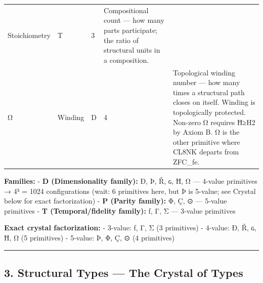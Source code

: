 \documentclass[12pt,a4paper]{article}
\begin{document}
\begin{longtable}[]{@{}lllll@{}}
\begin{minipage}[t]{0.12\columnwidth}
Stoichiometry\strut
\end{minipage} & \begin{minipage}[t]{0.16\columnwidth}\raggedright
T\strut
\end{minipage} & \begin{minipage}[t]{0.16\columnwidth}\raggedright
3\strut
\end{minipage} & \begin{minipage}[t]{0.27\columnwidth}\raggedright
Compositional count --- how many parts participate; the ratio of
structural units in a composition.\strut
\end{minipage}\tabularnewline
\begin{minipage}[t]{0.14\columnwidth}\raggedright
Ω\strut
\end{minipage} & \begin{minipage}[t]{0.12\columnwidth}\raggedright
Winding\strut
\end{minipage} & \begin{minipage}[t]{0.16\columnwidth}\raggedright
D\strut
\end{minipage} & \begin{minipage}[t]{0.16\columnwidth}\raggedright
4\strut
\end{minipage} & \begin{minipage}[t]{0.27\columnwidth}\raggedright
Topological winding number --- how many times a structural path closes
on itself. Winding is topologically protected. Non-zero Ω requires Ħ≥H2
by Axiom B. Ω is the other primitive where CL8NK departs from
ZFC\_fe.\strut
\end{minipage}\tabularnewline
\bottomrule
\end{longtable}

\textbf{Families:} - \textbf{D (Dimensionality family):} Ð, Þ, Ř, ɢ, Ħ,
Ω --- 4-value primitives → 4⁵ = 1024 configurations (wait: 6 primitives
here, but Þ is 5-value; see Crystal below for exact factorization) -
\textbf{P (Parity family):} Φ, Ç, ⊙ --- 5-value primitives - \textbf{T
(Temporal/fidelity family):} ƒ, Γ, Σ --- 3-value primitives

\textbf{Exact crystal factorization:} - 3-value: ƒ, Γ, Σ (3 primitives)
- 4-value: Ð, Ř, ɢ, Ħ, Ω (5 primitives) - 5-value: Þ, Φ, Ç, ⊙ (4
primitives)

\begin{center}\rule{0.5\linewidth}{0.5pt}\end{center}

\hypertarget{structural-types-the-crystal-of-types}{%
\subsection{3. Structural Types --- The Crystal of
Types}\label{structural-types-the-crystal-of-types}}
\end{document}
